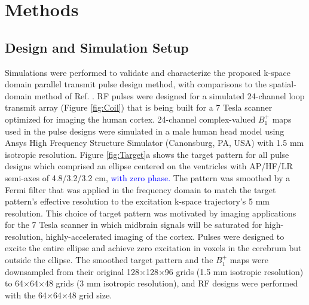 \section*{Methods}
\subsection*{Design and Simulation Setup}
Simulations were performed to validate and characterize the proposed k-space domain parallel transmit pulse design method,
with comparisons to the spatial-domain method of Ref. \cite{Grissom:2006:MRM}.
RF pulses were designed for a simulated 24-channel loop transmit array (Figure \ref{fig:Coil}) that is being built for a 7 Tesla scanner optimized
for imaging the human cortex.  
24-channel complex-valued $B_1^+$ maps used in the pulse designs were simulated in a male human head model using 
Ansys High Frequency Structure Simulator (Canonsburg, PA, USA) with 1.5 mm isotropic resolution. 
Figure \ref{fig:Target}a shows the target pattern for all pulse designs which comprised an ellipse centered on the ventricles with AP/HF/LR semi-axes of 4.8/3.2/3.2 cm,
\textcolor{blue}{with zero phase.} 
The pattern was smoothed by a Fermi filter that was applied in the frequency domain to match the target pattern's effective resolution to the excitation k-space trajectory's 5 mm resolution.
This choice of target pattern was motivated by imaging applications for the 7 Tesla scanner 
in which midbrain signals will be saturated for high-resolution, highly-accelerated imaging of the cortex. 
Pulses were designed to excite the entire ellipse and achieve zero excitation in voxels in the cerebrum but outside the ellipse. 
The smoothed target pattern and the $B_1^+$ maps were downsampled from their original 128$\times$128$\times$96 grids (1.5 mm isotropic resolution) to 
64$\times$64$\times$48 grids (3 mm isotropic resolution),
and RF designs were performed with the 64$\times$64$\times$48 grid size. 




